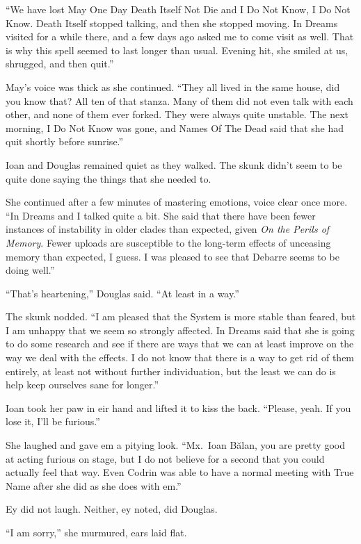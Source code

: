 ``We have lost May One Day Death Itself Not Die and I Do Not Know, I Do Not Know. Death Itself stopped talking, and then she stopped moving. In Dreams visited for a while there, and a few days ago asked me to come visit as well. That is why this spell seemed to last longer than usual. Evening hit, she smiled at us, shrugged, and then quit.''

May's voice was thick as she continued. ``They all lived in the same house, did you know that? All ten of that stanza. Many of them did not even talk with each other, and none of them ever forked. They were always quite unstable. The next morning, I Do Not Know was gone, and Names Of The Dead said that she had quit shortly before sunrise.''

Ioan and Douglas remained quiet as they walked. The skunk didn't seem to be quite done saying the things that she needed to.

She continued after a few minutes of mastering emotions, voice clear once more. ``In Dreams and I talked quite a bit. She said that there have been fewer instances of instability in older clades than expected, given \emph{On the Perils of Memory}. Fewer uploads are susceptible to the long-term effects of unceasing memory than expected, I guess. I was pleased to see that Debarre seems to be doing well.''

``That's heartening,'' Douglas said. ``At least in a way.''

The skunk nodded. ``I am pleased that the System is more stable than feared, but I am unhappy that we seem so strongly affected. In Dreams said that she is going to do some research and see if there are ways that we can at least improve on the way we deal with the effects. I do not know that there is a way to get rid of them entirely, at least not without further individuation, but the least we can do is help keep ourselves sane for longer.''

Ioan took her paw in eir hand and lifted it to kiss the back. ``Please, yeah. If you lose it, I'll be furious.''

She laughed and gave em a pitying look. ``Mx.~Ioan Bălan, you are pretty good at acting furious on stage, but I do not believe for a second that you could actually feel that way. Even Codrin was able to have a normal meeting with True Name after she did as she does with em.''

Ey did not laugh. Neither, ey noted, did Douglas.

``I am sorry,'' she murmured, ears laid flat.

